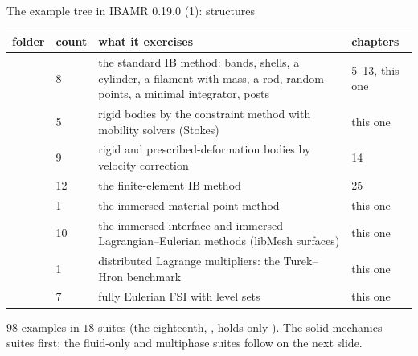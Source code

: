 \documentclass[aspectratio=169,11pt]{beamer}
\begin{document}
\begin{frame}{The example tree in IBAMR 0.19.0 (1): structures}
\label{fr:tree}
\scriptsize
\setlength{\tabcolsep}{3pt}
\begin{tabular}{@{}llL{0.5\textwidth}l@{}}
\toprule
folder & count & what it exercises & chapters\\
\midrule
{} & 8 & the standard IB method: bands, shells, a cylinder, a filament with mass, a rod, random points, a minimal integrator, posts & 5--13, this one\\
 & 5 & rigid bodies by the constraint method with mobility solvers (Stokes) & this one\\
 & 9 & rigid and prescribed-deformation bodies by velocity correction & 14\\
 & 12 & the finite-element IB method & 25\\
 & 1 & the immersed material point method & this one\\
 & 10 & the immersed interface and immersed Lagrangian--Eulerian methods (libMesh surfaces) & this one\\
 & 1 & distributed Lagrange multipliers: the Turek--Hron benchmark & this one\\
 & 7 & fully Eulerian FSI with level sets & this one\\
\bottomrule
\end{tabular}
\vspace{1mm}

\scriptsize $98$ examples in $18$ suites (the eighteenth, , holds only ). The solid-mechanics suites first; the fluid-only and multiphase suites follow on the next slide.
\end{frame}
\end{document}
